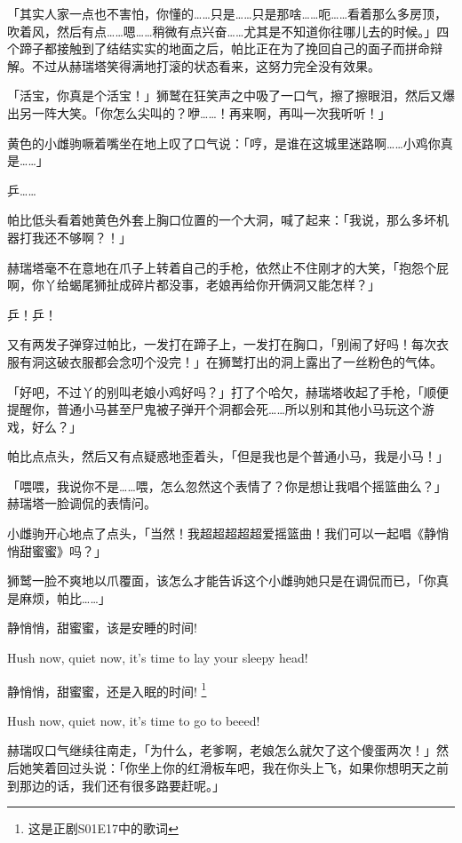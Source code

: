 「其实人家一点也不害怕，你懂的……只是……只是那啥……呃……看着那么多房顶，吹着风，然后有点……嗯……稍微有点兴奋……尤其是不知道你往哪儿去的时候。」四个蹄子都接触到了结结实实的地面之后，帕比正在为了挽回自己的面子而拼命辩解。不过从赫瑞塔笑得满地打滚的状态看来，这努力完全没有效果。

「活宝，你真是个活宝！」狮鹫在狂笑声之中吸了一口气，擦了擦眼泪，然后又爆出另一阵大笑。「你怎么尖叫的？咿……！再来啊，再叫一次我听听！」

黄色的小雌驹噘着嘴坐在地上叹了口气说：「哼，是谁在这城里迷路啊……小鸡你真是……」

乒……

帕比低头看着她黄色外套上胸口位置的一个大洞，喊了起来：「我说，那么多坏机器打我还不够啊？！」

赫瑞塔毫不在意地在爪子上转着自己的手枪，依然止不住刚才的大笑，「抱怨个屁啊，你丫给蝎尾狮扯成碎片都没事，老娘再给你开俩洞又能怎样？」

乒！乒！

又有两发子弹穿过帕比，一发打在蹄子上，一发打在胸口，「别闹了好吗！每次衣服有洞这破衣服都会念叨个没完！」在狮鹫打出的洞上露出了一丝粉色的气体。

「好吧，不过丫的别叫老娘小鸡好吗？」打了个哈欠，赫瑞塔收起了手枪，「顺便提醒你，普通小马甚至尸鬼被子弹开个洞都会死……所以别和其他小马玩这个游戏，好么？」

帕比点点头，然后又有点疑惑地歪着头，「但是我也是个普通小马，我是小马！」

「喂喂，我说你不是……喂，怎么忽然这个表情了？你是想让我唱个摇篮曲么？」赫瑞塔一脸调侃的表情问。

小雌驹开心地点了点头，「当然！我超超超超超爱摇篮曲！我们可以一起唱《静悄悄甜蜜蜜》吗？」

狮鹫一脸不爽地以爪覆面，该怎么才能告诉这个小雌驹她只是在调侃而已，「你真是麻烦，帕比……」

\begin{song}
静悄悄，甜蜜蜜，该是安睡的时间!

Hush now, quiet now, it's time to lay your sleepy head!

\medskip

静悄悄，甜蜜蜜，还是入眠的时间! \footnote{这是正剧S01E17中的歌词}

Hush now, quiet now, it's time to go to beeed!
\end{song}

赫瑞叹口气继续往南走，「为什么，老爹啊，老娘怎么就欠了这个傻蛋两次！」然后她笑着回过头说：「你坐上你的红滑板车吧，我在你头上飞，如果你想明天之前到那边的话，我们还有很多路要赶呢。」

